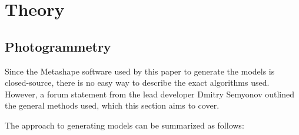 % 
% 
% 
% 

\chapter{Theory}


\section{Photogrammetry}
Since the Metashape software used by this paper to generate the models is closed-source, there is no easy way to describe the exact algorithms used.
However, a forum statement from the lead developer Dmitry Semyonov \parencite{metashapeForumPost} outlined the general methods used, which this section aims to cover.

The approach to generating models can be summarized as follows:

